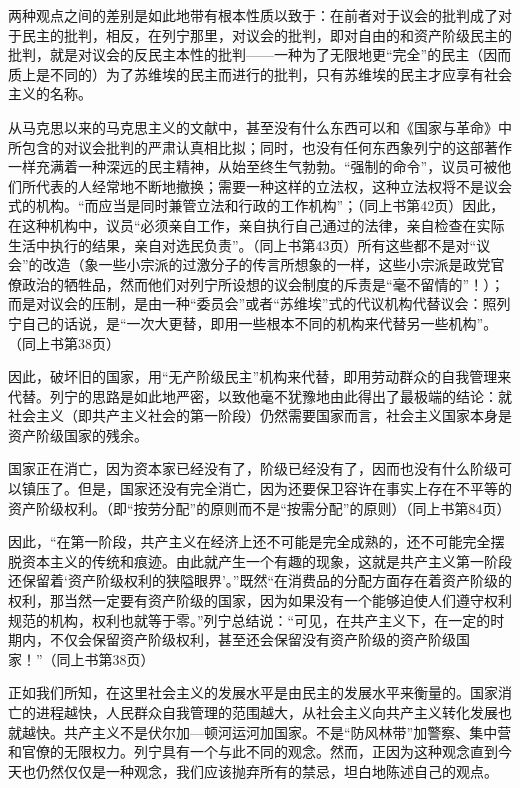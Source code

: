 \documentclass[UTF8, 12pt, a4paper]{ctexrep}
\begin{document}
两种观点之间的差别是如此地带有根本性质以致于：在前者对于议会的批判成了对于民主的批判，相反，在列宁那里，对议会的批判，即对自由的和资产阶级民主的批判，就是对议会的反民主本性的批判——一种为了无限地更“完全”的民主（因而质上是不同的）为了苏维埃的民主而进行的批判，只有苏维埃的民主才应享有社会主义的名称。

从马克思以来的马克思主义的文献中，甚至没有什么东西可以和《国家与革命》中所包含的对议会批判的严肃认真相比拟；同时，也没有任何东西象列宁的这部著作一样充满着一种深远的民主精神，从始至终生气勃勃。“强制的命令”，议员可被他们所代表的人经常地不断地撤换；需要一种这样的立法权，这种立法权将不是议会式的机构。“而应当是同时兼管立法和行政的工作机构”；（同上书第42页）因此，在这种机构中，议员“必须亲自工作，亲自执行自己通过的法律，亲自检查在实际生活中执行的结果，亲自对选民负责”。（同上书第43页）所有这些都不是对“议会”的改造（象一些小宗派的过激分子的传言所想象的一样，这些小宗派是政党官僚政治的牺牲品，然而他们对列宁所设想的议会制度的斥责是“毫不留情的”！）；而是对议会的压制，是由一种“委员会”或者“苏维埃”式的代议机构代替议会：照列宁自己的话说，是“一次大更替，即用一些根本不同的机构来代替另一些机构”。（同上书第38页）

因此，破坏旧的国家，用“无产阶级民主”机构来代替，即用劳动群众的自我管理来代替。列宁的思路是如此地严密，以致他毫不犹豫地由此得出了最极端的结论：就社会主义（即共产主义社会的第一阶段）仍然需要国家而言，社会主义国家本身是资产阶级国家的残余。

国家正在消亡，因为资本家已经没有了，阶级已经没有了，因而也没有什么阶级可以镇压了。但是，国家还没有完全消亡，因为还要保卫容许在事实上存在不平等的资产阶级权利。（即“按劳分配”的原则而不是“按需分配”的原则）（同上书第84页）

因此，“在第一阶段，共产主义在经济上还不可能是完全成熟的，还不可能完全摆脱资本主义的传统和痕迹。由此就产生一个有趣的现象，这就是共产主义第一阶段还保留着‘资产阶级权利的狭隘眼界’。”既然“在消费品的分配方面存在着资产阶级的权利，那当然一定要有资产阶级的国家，因为如果没有一个能够迫使人们遵守权利规范的机构，权利也就等于零。”列宁总结说：“可见，在共产主义下，在一定的时期内，不仅会保留资产阶级权利，甚至还会保留没有资产阶级的资产阶级国家！”（同上书第38页）

正如我们所知，在这里社会主义的发展水平是由民主的发展水平来衡量的。国家消亡的进程越快，人民群众自我管理的范围越大，从社会主义向共产主义转化发展也就越快。共产主义不是伏尔加—顿河运河加国家。不是“防风林带”加警察、集中营和官僚的无限权力。列宁具有一个与此不同的观念。然而，正因为这种观念直到今天也仍然仅仅是一种观念，我们应该抛弃所有的禁忌，坦白地陈述自己的观点。
\end{document}
